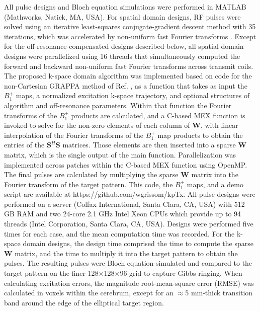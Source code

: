 \par All pulse designs and Bloch equation simulations were performed in MATLAB (Mathworks, Natick, MA, USA).
For spatial domain designs, 
RF pulses were solved using an iterative least-squares conjugate-gradient descent method \cite{Grissom:2006:MRM} with 35 iterations,
which was accelerated by non-uniform fast Fourier transforms \cite{Fessler:2003fk}. 
Except for the off-resonance-compensated designs described below, 
all spatial domain designs were parallelized using 16 threads that simultaneously computed the forward and backward 
non-uniform fast Fourier transforms across transmit coils. 
The proposed k-space domain algorithm was implemented based on code for the non-Cartesian GRAPPA method of Ref. \cite{luo2019grappa},
as a function that takes as input the $B_1^+$ maps, 
a normalized excitation k-space trajectory, and optional structures of algorithm and off-resonance parameters. 
Within that function the Fourier transforms of the $B_1^+$ products are calculated,
and a C-based MEX function is invoked to solve for the non-zero elements of each column of $\bm{W}$,
with linear interpolation of the Fourier transforms of the $B_1^+$ map products to obtain the entries of the $\bm{S}^H\bm{S}$ matrices. 
Those elements are then inserted into a sparse $\bm{W}$ matrix, which is the single output of the main function. 
Parallelization was implemented across patches within the C-based MEX function using OpenMP. 
The final pulses are calculated by multiplying the sparse $\bm{W}$ matrix into the Fourier transform of the target pattern. 
This code, the $B_1^+$ maps, and a demo script are available at https://github.com/wgrissom/kpTx. 
All pulse designs were performed on a server (Colfax International, Santa Clara, CA, USA) 
with 512 GB RAM and two 24-core 2.1 GHz Intel Xeon CPUs which provide up to 94 threads (Intel Corporation, Santa Clara, CA, USA). 
Designs were performed five times for each case, and the mean computation time was recorded.
For the k-space domain designs, the design time comprised the time to compute the sparse $\bm{W}$ matrix, 
and the time to multiply it into the target pattern to obtain the pulses.
The resulting pulses were Bloch equation-simulated and compared to the target pattern on the finer 128$\times$128$\times$96 grid to capture Gibbs ringing. 
When calculating excitation errors, the magnitude root-mean-square error (RMSE) was calculated in voxels within the cerebrum,
except for an $\approx$5 mm-thick transition band around the edge of the elliptical target region.


